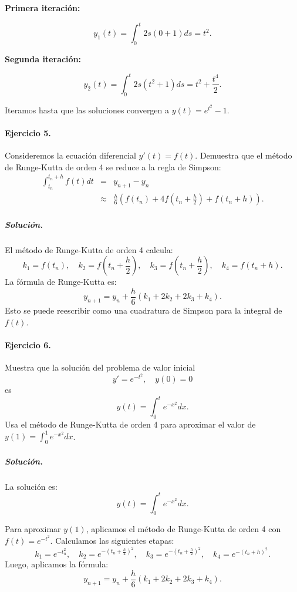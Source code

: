 \documentclass[12pt,letterpaper,oneside]{article}
\begin{document}
\textbf{Primera iteración:}

\[
y_1(t) = \int_0^t 2s(0+1) ds = t^2.
\]

\textbf{Segunda iteración:}

\[
y_2(t) = \int_0^t 2s(t^2+1) ds = t^2 + \frac{t^4}{2}.
\]

Iteramos hasta que las soluciones convergen a $y(t) = e^{t^2} - 1$.

\paragraph*{Ejercicio 5.} Consideremos la ecuación diferencial $y'(t) = f(t)$. Demuestra que el método de Runge-Kutta de orden 4 se reduce a la regla de Simpson:
\[
\begin{array}{ccl}
\int_{t_n}^{t_n+h}f(t)dt &=& y_{n+1} - y_n \\
 &\approx & \frac{h}{6}\left(f\left(t_n \right) + 4f\left(t_n+\frac{h}{2}\right) + f\left(t_n+h\right)\right).
\end{array}
\]

\subparagraph*{Solución.}

El método de Runge-Kutta de orden 4 calcula:
\[
k_1 = f(t_n),\quad k_2 = f(t_n + \frac{h}{2}),\quad k_3 = f(t_n + \frac{h}{2}),\quad k_4 = f(t_n + h).
\]
La fórmula de Runge-Kutta es:
\[
y_{n+1} = y_n + \frac{h}{6}(k_1 + 2k_2 + 2k_3 + k_4).
\]
Esto se puede reescribir como una cuadratura de Simpson para la integral de $f(t)$.

\paragraph*{Ejercicio 6.} Muestra que la solución del problema de valor inicial
\[
y'=e^{-t^2},\quad y(0)=0
\]
es
\[
y(t)=\int_0^te^{-x^2}dx.
\]
Usa el método de Runge-Kutta de orden 4 para aproximar el valor de $y(1)=\int_0^1e^{-x^2}dx$.

\subparagraph*{Solución.}

La solución es:
\[
y(t) = \int_0^t e^{-x^2} dx.
\]

Para aproximar $y(1)$, aplicamos el método de Runge-Kutta de orden 4 con $f(t) = e^{-t^2}$. Calculamos las siguientes etapas:
\[
k_1 = e^{-t_n^2},\quad k_2 = e^{-\left(t_n + \frac{h}{2}\right)^2},\quad k_3 = e^{-\left(t_n + \frac{h}{2}\right)^2},\quad k_4 = e^{-\left(t_n + h\right)^2}.
\]
Luego, aplicamos la fórmula:
\[
y_{n+1} = y_n + \frac{h}{6}(k_1 + 2k_2 + 2k_3 + k_4).
\]
\end{document}
